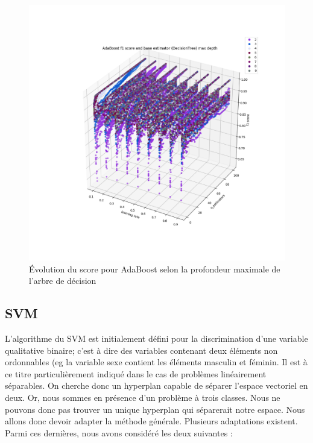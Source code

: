 \documentclass[a4paper]{report}
\begin{document}
\begin{figure}[h]
\centering
\includegraphics[width=\textwidth]{img/adaboost_depth.png}
\caption{Évolution du score pour AdaBoost selon la profondeur maximale de l'arbre de décision\label{adaboost_depth}}
\end{figure}

\subsection{SVM}

L'algorithme du SVM est initialement défini pour la discrimination d'une variable qualitative binaire; c'est à dire des variables contenant deux éléments non ordonnables (eg la variable sexe contient les éléments masculin et féminin. Il est à ce titre particulièrement indiqué dans le cas de problèmes linéairement séparables. On cherche donc un hyperplan capable de séparer l'espace vectoriel en deux. Or, nous sommes en présence d'un problème à trois classes. Nous ne pouvons donc pas trouver un unique hyperplan qui séparerait notre espace. Nous allons donc devoir adapter la méthode générale. Plusieurs adaptations existent. Parmi ces dernières, nous avons considéré les deux suivantes :
\end{document}
